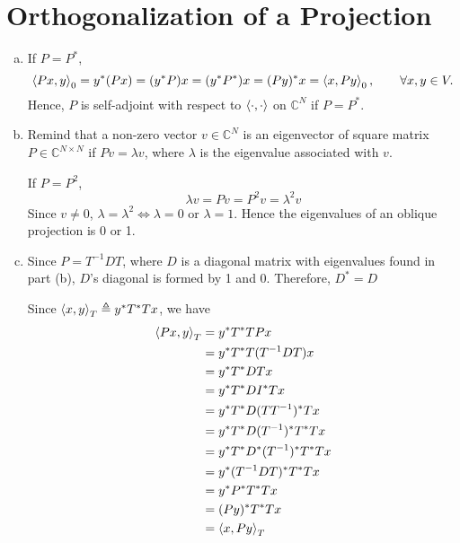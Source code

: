 \section{Orthogonalization of a Projection}\label{sec:part3}

\begin{enumerate}[(a)]
\item If $P = P^*$,
\[\left\langle Px, y \right\rangle_0 = y^* (Px) = (y^*P)x = (y^*P^*)x = (Py)^*x = \left\langle x, Py \right\rangle_0, \qquad \forall x, y \in V.\]
Hence, $P$ is self-adjoint with respect to $\left\langle \cdot, \cdot \right\rangle$ on $\mathbb{C}^N$ if $P = P^*$.

\item Remind that a non-zero vector $v \in \mathbb{C}^N$ is an eigenvector of square matrix $P \in \mathbb{C}^{N\times N}$ if $Pv = \lambda v$, where $\lambda$ is the eigenvalue associated with $v$. 

If $P = P^2$,
\[\lambda v = P v = P^2 v = \lambda^2 v\]
Since $v \neq 0$, $\lambda = \lambda^2 \Leftrightarrow \lambda = 0 \text{ or } \lambda = 1$. Hence the eigenvalues of an oblique projection is 0 or 1.

\item Since $P = T^{-1}DT$, where $D$ is a diagonal matrix with eigenvalues found in part (b), $D$'s diagonal is formed by 1 and 0. Therefore, $D^* = D$

Since $\left\langle x, y \right\rangle_T \triangleq y^*T^*Tx$, we have
\begin{align*}
	\left\langle Px, y \right\rangle_T
	&= y^* T^* T P x \\
	&= y^* T^* T (T^{-1} D T) x \\
	&= y^* T^* D T x \\
	&= y^* T^* D I^* T x \\
	&= y^* T^* D (T T^{-1})^* T x \\
	&= y^* T^* D (T^{-1})^* T^* T x \\
	&= y^* T^* D^* (T^{-1})^* T^* T x \\
	&= y^* (T^{-1}DT)^* T^* T x \\
	&= y^* P^* T^* T x \\
	&= (Py)^* T^* T x \\
	&= \left\langle x, Py \right\rangle_T
\end{align*}

\end{enumerate}